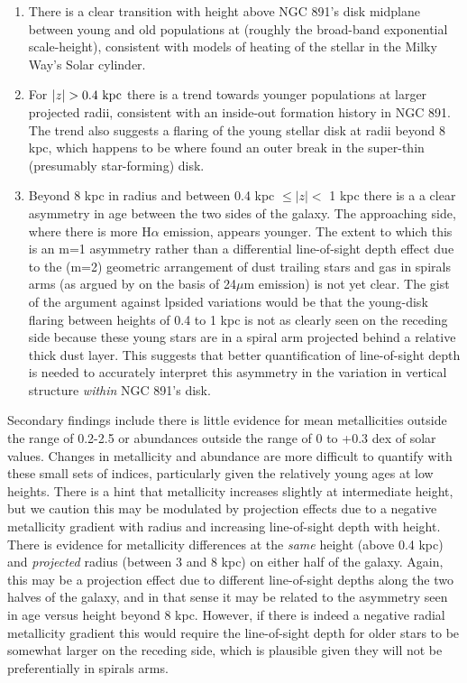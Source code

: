 \begin{enumerate}
  \item There is a clear transition with height above NGC 891's disk
    midplane between young and old populations at 
    (roughly the broad-band exponential scale-height), consistent with
    models of heating of the stellar in the Milky Way's Solar
    cylinder.

  \item For $|z| > 0.4~\mathrm{kpc} $ there is a trend towards younger
    populations at larger projected radii, consistent with an
    inside-out formation history in NGC 891. The trend also suggests a
    flaring of the young stellar disk at radii beyond 8 kpc, which
    happens to be where \citet{Schechtman-Rook13} found an outer break
    in the super-thin (presumably star-forming) disk.

  \item Beyond 8 kpc in radius and between 0.4 kpc $\leq |z| <$ 1 kpc
    there is a a clear asymmetry in age between the two sides of the
    galaxy. The approaching side, where there is more H$\alpha$
    emission, appears younger. The extent to which this is an m=1
    asymmetry rather than a differential line-of-sight depth effect
    due to the (m=2) geometric arrangement of dust trailing stars and
    gas in spirals arms (as argued by \citet{Kamphuis07b} on the basis
    of 24$\mu$m emission) is not yet clear.  The gist of the argument
    against lpsided variations would be that the young-disk flaring
    between heights of 0.4 to 1 kpc is not as clearly seen on the
    receding side because these young stars are in a spiral arm
    projected behind a relative thick dust layer.  This suggests that
    better quantification of line-of-sight depth is needed to
    accurately interpret this asymmetry in the variation in vertical
    structure {\it within} NGC 891's disk.

\end{enumerate}

Secondary findings include there is little evidence for mean
metallicities outside the range of 0.2-2.5 \Zsol or abundances
outside the range of 0 to +0.3 dex of solar values. Changes in
metallicity and abundance are more difficult to quantify with these
small sets of indices, particularly given the relatively young ages at
low heights. There is a hint that metallicity increases slightly at
intermediate height, but we caution this may be modulated by
projection effects due to a negative metallicity gradient with radius
and increasing line-of-sight depth with height. There is evidence for
metallicity differences at the {\it same} height (above 0.4 kpc) and
{\it projected} radius (between 3 and 8 kpc) on either half of the
galaxy. Again, this may be a projection effect due to different
line-of-sight depths along the two halves of the galaxy, and in that
sense it may be related to the asymmetry seen in age versus height
beyond 8 kpc. However, if there is indeed a negative radial
metallicity gradient this would require the line-of-sight depth for
older stars to be somewhat larger on the receding side, which is
plausible given they will not be preferentially in spirals arms.

